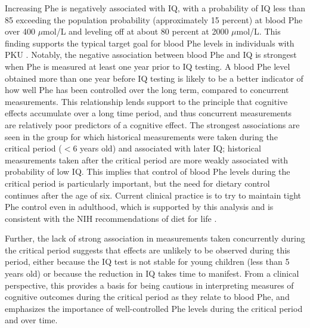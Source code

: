 \documentclass{svjour3}                     %
\begin{document}
Increasing Phe is negatively associated with IQ, with a probability of IQ less than 85 exceeding the population probability (approximately 15 percent) at blood Phe over 400 $\mu$mol/L and leveling off at about 80 percent at 2000 $\mu$mol/L. This finding supports the typical target goal for blood Phe levels in individuals with PKU \cite[under 360 $\mu$mol/L,][]{NationalInstitutesofHealthConsensusDevelopmentPanel:2001ti}. Notably, the negative association between blood Phe and IQ is strongest when Phe is measured at least one year prior to IQ testing. A blood Phe level obtained more than one year before IQ testing is likely to be a better indicator of how well Phe has been controlled over the long term, compared to concurrent measurements. This relationship lends support to the principle that cognitive effects accumulate over a long time period, and thus concurrent measurements are relatively poor predictors of a cognitive effect. The strongest associations are seen in the group for which historical measurements were taken during the critical period ($<6$ years old) and associated with later IQ; historical measurements taken after the critical period are more weakly associated with probability of low IQ. This implies that control of blood Phe levels during the critical period is particularly important, but the need for dietary control continues after the age of six. Current clinical practice is to try to maintain tight Phe control even in adulthood, which is supported by this analysis and is consistent with the NIH recommendations of diet for life \citep{Koch:2002ul}.

Further, the lack of strong association in measurements taken concurrently during the critical period suggests that effects are unlikely to be observed during this period, either because the IQ test is not stable for young children (less than 5 years old) or because the reduction in IQ takes time to manifest. From a clinical perspective, this provides a basis for being cautious in interpreting measures of cognitive outcomes during the critical period as they relate to blood Phe, and emphasizes the importance of well-controlled Phe levels during the critical period and over time.
\end{document}
